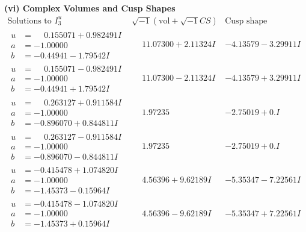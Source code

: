 \documentclass[1p]{elsarticle_modified}
\theoremstyle{definition}
\newcommand{\I}{\sqrt{-1}}
\begin{document}
\newpage\flushleft \textbf{(vi) Complex Volumes and Cusp Shapes}
$$\begin{array}{c|c|c}  
\text{Solutions to }I^u_{3}& \I (\text{vol} + \sqrt{-1}CS) & \text{Cusp shape}\\
 \hline 
\begin{aligned}
u &= \phantom{-}0.155071 + 0.982491 I \\
a &= -1.00000\phantom{ +0.000000I} \\
b &= -0.44941 - 1.79542 I\end{aligned}
 & \phantom{-}11.07300 + 2.11324 I & -4.13579 - 3.29911 I \\ \hline\begin{aligned}
u &= \phantom{-}0.155071 - 0.982491 I \\
a &= -1.00000\phantom{ +0.000000I} \\
b &= -0.44941 + 1.79542 I\end{aligned}
 & \phantom{-}11.07300 - 2.11324 I & -4.13579 + 3.29911 I \\ \hline\begin{aligned}
u &= \phantom{-}0.263127 + 0.911584 I \\
a &= -1.00000\phantom{ +0.000000I} \\
b &= -0.896070 + 0.844811 I\end{aligned}
 & \phantom{-}1.97235\phantom{ +0.000000I} & -2.75019 + 0. I\phantom{ +0.000000I} \\ \hline\begin{aligned}
u &= \phantom{-}0.263127 - 0.911584 I \\
a &= -1.00000\phantom{ +0.000000I} \\
b &= -0.896070 - 0.844811 I\end{aligned}
 & \phantom{-}1.97235\phantom{ +0.000000I} & -2.75019 + 0. I\phantom{ +0.000000I} \\ \hline\begin{aligned}
u &= -0.415478 + 1.074820 I \\
a &= -1.00000\phantom{ +0.000000I} \\
b &= -1.45373 - 0.15964 I\end{aligned}
 & \phantom{-}4.56396 + 9.62189 I & -5.35347 - 7.22561 I \\ \hline\begin{aligned}
u &= -0.415478 - 1.074820 I \\
a &= -1.00000\phantom{ +0.000000I} \\
b &= -1.45373 + 0.15964 I\end{aligned}
 & \phantom{-}4.56396 - 9.62189 I & -5.35347 + 7.22561 I \\ \hline\begin{aligned}

\end{aligned}
\end{array}$$
\end{document}
